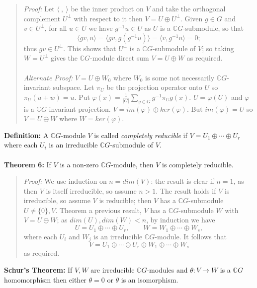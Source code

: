 \begin{quote}
\emph{Proof:}  
Let $\langle\ ,\ \rangle$ be the inner product on $V$ 
and take the orthogonal complement $U^\perp$ with respect to it then
$V=U\oplus U^\perp$.
Given $g\in G$ and $v\in U^\perp$, for all $u\in U$ we have $g^{-1}u\in U$
as $U$ is a ${\mathbb C}G$-submodule, so that
$$\langle gv,u\rangle=\langle gv,g(g^{-1}u)\rangle=\langle v,g^{-1}u\rangle=0;$$
thus $gv\in U^\perp$. This shows that $U^\perp$ is a ${\mathbb C}G$-submodule of $V$; so
taking $W=U^\perp$ gives the ${\mathbb C}G$-module direct sum $V=U\oplus W$ as
required.
\\
\\
\emph{Alternate Proof:} $V= U \oplus W_0$ where $W_0$ is some
not necessarily ${\mathbb C}G$-invariant subspace.
Let $\pi_U$ be the projection operator onto $U$ so $\pi_U(u + w)= u$.
Put $\varphi(x)= {\frac 1 {|G|}} \sum_{g \in G} g^{-1} \pi_U g (x)$.
$U = \varphi(U)$ and $\varphi$ is a ${\mathbb C}G$-invariant projection.
$V= im( \varphi ) \oplus ker( \varphi )$.  But $im(\varphi)= U$ so
$V= U \oplus W$ where $W= ker( \varphi )$.
\end{quote}
{\bf Definition:} A ${\mathbb C}G$-module $V$ is called
\emph{completely reducible} if $V=U_1\oplus\cdots\oplus U_r$ where
each $U_i$ is an irreducible ${\mathbb C}G$-submodule of $V$.
\\
\\
{\bf Theorem 6:} If $V$ is a non-zero ${\mathbb C}G$-module, then $V$ is
completely reducible.
\begin{quote}
\emph{Proof:}
We use induction on $n= dim(V)$: the result is clear if $n=1$, as then
$V$ is itself irreducible, so assume $n>1$. The result holds if $V$ is
irreducible, so assume $V$ is reducible; then $V$ has a ${\mathbb C}G$-submodule
$U \neq \{0\},V$.  Theorem a previous result, $V$ has a
${\mathbb C}G$-submodule $W$ with $V=U\oplus W$; as $dim(U),dim(W)<n$, by
induction we have
$$U= U_1 \oplus \cdots \oplus U_r,\qquad W= W_1 \oplus \cdots \oplus W_s,$$
where each $U_i$ and $W_j$ is an irreducible ${\mathbb C}G$-module. It follows that
$$V= U_1 \oplus \cdots \oplus U_r \oplus W_1 \oplus \cdots \oplus W_s$$
as required.
\end{quote}
{\bf Schur's Theorem:}  
If $V, W$ are irreducible ${\mathbb C}G$-modules and $\theta: V \rightarrow W$ is a 
${\mathbb C}G$ homomorphism then either $\theta=0$ or $\theta$ is an isomorphism.
